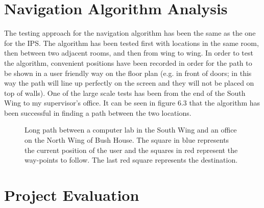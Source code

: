 \section{Navigation Algorithm Analysis}

The testing approach for the navigation algorithm has been the same as the one for the IPS. The algorithm has been tested first with locations in the same room, then between two adjacent rooms, and then from wing to wing. In order to test the algorithm, convenient positions have been recorded in order for the path to be shown in a user friendly way on the floor plan (e.g. in front of doors; in this way the path will line up perfectly on the screen and they will not be placed on top of walls). One of the large scale tests has been from the end of the South Wing to my supervisor's office. It can be seen in figure 6.3 that the algorithm has been successful in finding a path between the two locations.

\begin{figure}[H]
    \centering
    \caption{Long path between a computer lab in the South Wing and an office on the North Wing of Bush House. The square in blue represents the current position of the user and the squares in red represent the way-points to follow. The last red square represents the destination.}
    \label{fig:nav-long-path}
\end{figure}

\section{Project Evaluation}

